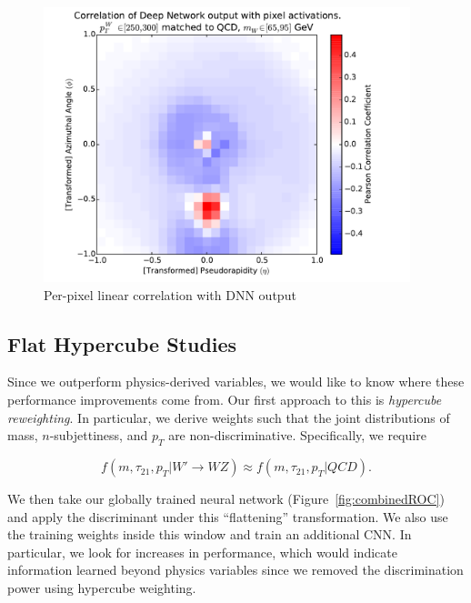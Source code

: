\begin{figure}[!htbp]
  \centering
  \includegraphics[width=0.95\textwidth]{figures/pixel-activations-corr.pdf}
  \caption{Per-pixel linear correlation with DNN output}
  \label{fig:corr}
\end{figure}










\subsection{Flat Hypercube Studies} %
\label{sub:flat_hypercube_studies}

Since we outperform physics-derived variables, we would like to know where these performance improvements come from. Our first approach to this is \emph{hypercube reweighting}. In particular, we derive weights such that the joint distributions of mass, $n$-subjettiness, and $p_T$ are non-discriminative. Specifically, we require

\begin{equation}
  f(m, \tau_{21}, p_T| W'\rightarrow WZ) \approx f(m, \tau_{21}, p_T| QCD).
\end{equation}

We then take our globally trained neural network (Figure~\ref{fig:combinedROC}) and apply the discriminant under this ``flattening'' transformation. We also use the training weights inside this window and train an additional CNN. In particular, we look for increases in performance, which would indicate information learned beyond physics variables since we removed the discrimination power using hypercube weighting.

